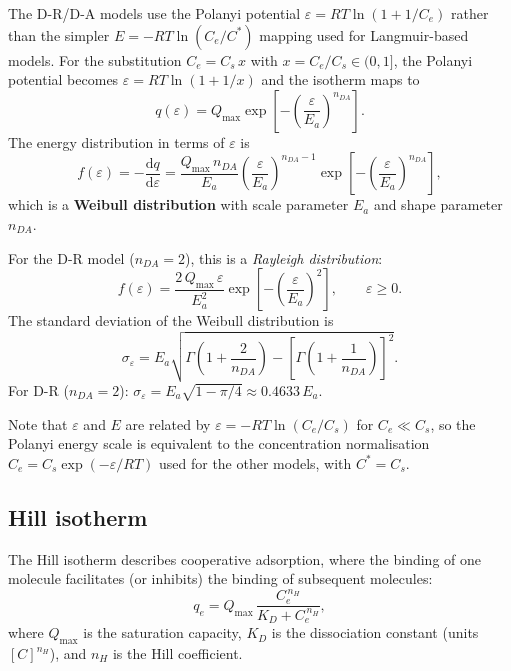 \documentclass[12pt]{article}
\begin{document}
	The D-R/D-A models use the Polanyi potential
	$\varepsilon = RT\ln(1 + 1/C_e)$ rather than the simpler
	$E = -RT\ln(C_e/C^{\ast})$ mapping used for Langmuir-based
	models.  For the substitution $C_e = C_s\,x$ with
	$x = C_e/C_s \in (0,1]$, the Polanyi potential becomes
	$\varepsilon = RT\ln(1 + 1/x)$ and the isotherm maps to
	\begin{equation}
		q(\varepsilon)
		= Q_{\max}
		\exp\!\left[-\left(\frac{\varepsilon}{E_a}
		\right)^{n_{DA}}\right].
		\label{eq:qeps_DA}
	\end{equation}
	The energy distribution in terms of $\varepsilon$ is
	\begin{equation}
		f(\varepsilon)
		= -\frac{\mathrm{d}q}{\mathrm{d}\varepsilon}
		= \frac{Q_{\max}\, n_{DA}}{E_a}
		\left(\frac{\varepsilon}{E_a}\right)^{n_{DA}-1}
		\exp\!\left[-\left(\frac{\varepsilon}{E_a}
		\right)^{n_{DA}}\right],
		\label{eq:feps_DA}
	\end{equation}
	which is a \textbf{Weibull distribution} with scale parameter
	$E_a$ and shape parameter $n_{DA}$.

	For the D-R model ($n_{DA} = 2$), this is a \emph{Rayleigh
	distribution}:
	\begin{equation}
		f(\varepsilon)
		= \frac{2\,Q_{\max}\,\varepsilon}{E_a^2}
		\exp\!\left[-\left(\frac{\varepsilon}{E_a}
		\right)^{2}\right],
		\qquad \varepsilon \geq 0.
	\end{equation}
	The standard deviation of the Weibull distribution is
	\begin{equation}
		\sigma_\varepsilon
		= E_a\sqrt{
		\Gamma\!\left(1 + \frac{2}{n_{DA}}\right)
		- \left[\Gamma\!\left(1 + \frac{1}{n_{DA}}\right)
		\right]^{2}}.
		\label{eq:sigmaeps_DA}
	\end{equation}
	For D-R ($n_{DA} = 2$):
	$\sigma_\varepsilon
	= E_a\sqrt{1 - \pi/4}
	\approx 0.4633\,E_a$.

	Note that $\varepsilon$ and $E$ are related by
	$\varepsilon = -RT\ln(C_e/C_s)$ for $C_e \ll C_s$, so the
	Polanyi energy scale is equivalent to the concentration
	normalisation $C_e = C_s\exp(-\varepsilon/RT)$ used for the
	other models, with $C^{\ast} = C_s$.

	\subsection{Hill isotherm}

	The Hill isotherm describes cooperative adsorption, where the
	binding of one molecule facilitates (or inhibits) the binding of
	subsequent molecules:
	\begin{equation}
		q_e = Q_{\max}\,\frac{C_e^{\,n_H}}{K_D + C_e^{\,n_H}},
		\label{eq:Hill}
	\end{equation}
	where $Q_{\max}$ is the saturation capacity, $K_D$ is the
	dissociation constant (units $[C]^{n_H}$), and $n_H$ is the
	Hill coefficient.
\end{document}
